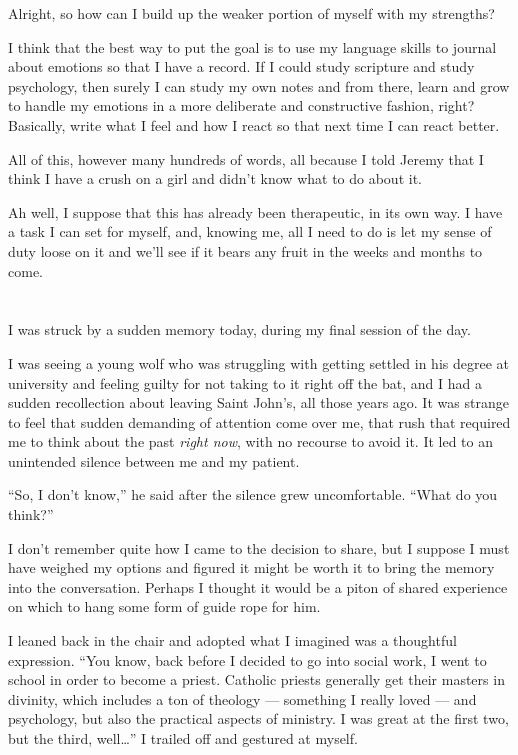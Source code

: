 Alright, so how can I build up the weaker portion of myself with my strengths?

I think that the best way to put the goal is to use my language skills to journal about emotions so that I have a record. If I could study scripture and study psychology, then surely I can study my own notes and from there, learn and grow to handle my emotions in a more deliberate and constructive fashion, right? Basically, write what I feel and how I react so that next time I can react better.

All of this, however many hundreds of words, all because I told Jeremy that I think I have a crush on a girl and didn't know what to do about it.

Ah well, I suppose that this has already been therapeutic, in its own way. I have a task I can set for myself, and, knowing me, all I need to do is let my sense of duty loose on it and we'll see if it bears any fruit in the weeks and months to come.

\section{}

I was struck by a sudden memory today, during my final session of the day.

I was seeing a young wolf who was struggling with getting settled in his degree at university and feeling guilty for not taking to it right off the bat, and I had a sudden recollection about leaving Saint John's, all those years ago. It was strange to feel that sudden demanding of attention come over me, that rush that required me to think about the past \emph{right now}, with no recourse to avoid it. It led to an unintended silence between me and my patient.

``So, I don't know,'' he said after the silence grew uncomfortable. ``What do you think?''

I don't remember quite how I came to the decision to share, but I suppose I must have weighed my options and figured it might be worth it to bring the memory into the conversation. Perhaps I thought it would be a piton of shared experience on which to hang some form of guide rope for him.

I leaned back in the chair and adopted what I imagined was a thoughtful expression. ``You know, back before I decided to go into social work, I went to school in order to become a priest. Catholic priests generally get their masters in divinity, which includes a ton of theology --- something I really loved --- and psychology, but also the practical aspects of ministry. I was great at the first two, but the third, well\ldots{}'' I trailed off and gestured at myself.


